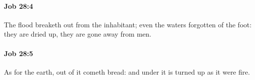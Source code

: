 		\paragraph{Job 28:4} %
			\label{JOB-28-4}

			The flood breaketh out from the inhabitant; even the waters forgotten of the foot: they are dried up, they are gone away from men.


		\paragraph{Job 28:5} %
			\label{JOB-28-5}

			As for the earth, out of it cometh bread: and under it is turned up as it were fire.


